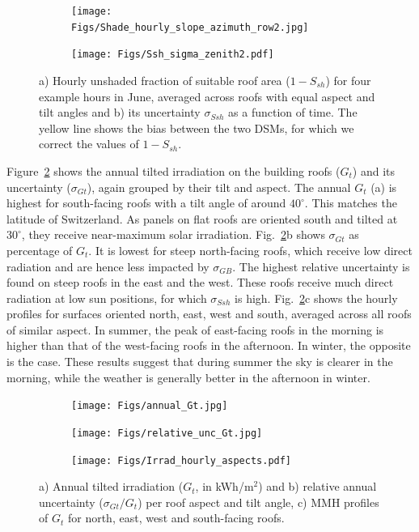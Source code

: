 \begin{figure}[tb]
\centering
\begin{subfigure}{.98\textwidth}
    \centering
    \texttt{[image: Figs/Shade\_hourly\_slope\_azimuth\_row2.jpg]} \subcaption{}
\end{subfigure}
\begin{subfigure}{.98\textwidth}
    \centering
    \texttt{[image: Figs/Ssh\_sigma\_zenith2.pdf]} 
    \subcaption{}
\end{subfigure}
\caption{a) Hourly unshaded fraction of suitable roof area ($1-S_{sh}$) for four example hours in June, averaged across roofs with equal aspect and tilt angles and b) its uncertainty $\sigma_{\mathit{Ssh}}$ as a function of time. The yellow line shows the bias between the two DSMs, for which we correct the values of $1-S_{sh}$.}
\label{fig:Sh}
\end{figure}

Figure~\ref{fig:Gt} shows the annual tilted irradiation on the building roofs ($G_t$) and its uncertainty ($\sigma_{Gt}$), again grouped by their tilt and aspect. The annual $G_t$ (a) is highest for south-facing roofs with a tilt angle of around $40^\circ$. This matches the latitude of Switzerland. As panels on flat roofs are oriented south and tilted at $30^\circ$, they receive near-maximum solar irradiation.
Fig.~\ref{fig:Gt}b shows $\sigma_{Gt}$ as percentage of $G_t$. It is lowest for steep north-facing roofs, which receive low direct radiation and are hence less impacted by $\sigma_{GB}$. 
The highest relative uncertainty is found on steep roofs in the east and the west. 
These roofs receive much direct radiation at low sun positions, for which $\sigma_{\mathit{Ssh}}$ is high.
%
Fig.~\ref{fig:Gt}c shows the hourly profiles for surfaces oriented north, east, west and south, averaged across all roofs of similar aspect. In summer, the peak of east-facing roofs in the morning is higher than that of the west-facing roofs in the afternoon. In winter, the opposite is the case. 
These results suggest that during summer the sky is clearer in the morning, while the weather is generally better in the afternoon in winter. 

\begin{figure}[tb]
\centering
\begin{subfigure}{.49\textwidth}
  \centering
  \texttt{[image: Figs/annual\_Gt.jpg]}  
  \subcaption{}
\end{subfigure}
\begin{subfigure}{.49\textwidth}
  \centering
  \texttt{[image: Figs/relative\_unc\_Gt.jpg]}  
  \subcaption{}
\end{subfigure}
\begin{subfigure}{.9\textwidth}
  \centering
  \texttt{[image: Figs/Irrad\_hourly\_aspects.pdf]} 
  \subcaption{}
\end{subfigure}
\caption{a) Annual tilted irradiation ($G_t$, in kWh/m$^2$) and b) relative annual uncertainty ($\sigma_{Gt} / G_t$) per roof aspect and tilt angle, c) MMH profiles of $G_t$ for north, east, west and south-facing roofs.}
\label{fig:Gt}
\end{figure}

